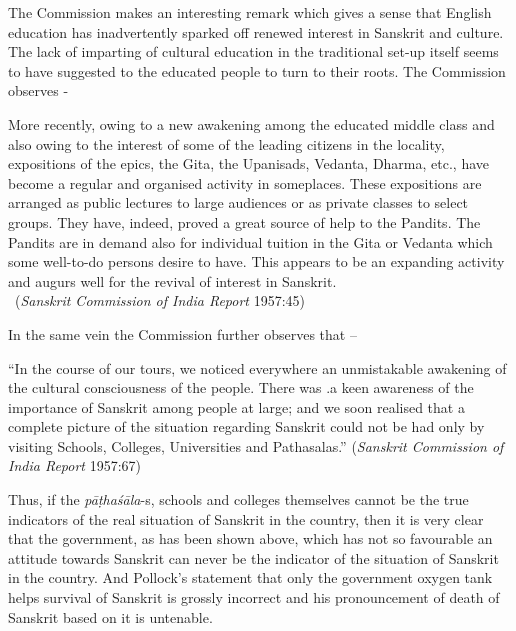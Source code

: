 The Commission makes an interesting remark which gives a sense that English education has inadvertently sparked off renewed interest in Sanskrit and culture. The lack of imparting of cultural education in the traditional set-up itself seems to have suggested to the educated people to turn to their roots. The Commission observes -        
\begin{myquote}
\eleven
More recently, owing to a new awakening among the educated middle class and also owing to the interest of some of the leading citizens in the locality, expositions of the epics, the Gita, the Upanisads, Vedanta, Dharma, etc., have become a regular and organised activity in some\break places. These expositions are arranged as public lectures to large audiences or as private classes to select groups. They have, indeed, proved a great source of help to the Pandits. The Pandits are in demand also for individual tuition in the Gita or Vedanta which some well-to-do persons desire to have. This appears to be an expanding activity and augurs well for the revival of interest in Sanskrit.\\[-15pt]

~\hfill ({\sl Sanskrit Commission of India Report} 1957:45)
\end{myquote}

In the same vein the Commission further observes that – 
\begin{myquote}
\eleven
“In the course of our tours, we noticed everywhere an unmistakable awakening of the cultural consciousness of the people. There was .a keen awareness of the importance of Sanskrit among people at large; and we soon realised that a complete picture of the situation regarding Sanskrit could not be had only by visiting Schools, Colleges, Universities and Pathasalas.” \hfill ({\sl Sanskrit Commission of India Report} 1957:67)
\end{myquote}
\newpage

Thus, if the {\sl pāṭhaśāla}-s, schools and colleges themselves cannot be the true indicators of the real situation of Sanskrit in the country, then it is very clear that the government, as has been shown above, which has not so favourable an attitude towards Sanskrit can never be the indicator of the situation of Sanskrit in the country. And Pollock’s statement that only the government oxygen tank helps survival of Sanskrit is grossly incorrect and his pronouncement of death of Sanskrit based on it is untenable.

